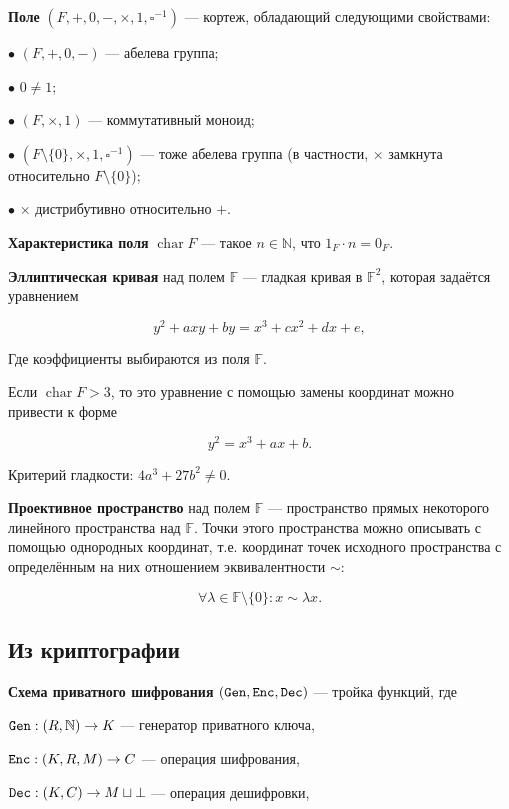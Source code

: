 \documentclass[a4paper,14pt]{extarticle}
\DeclareMathOperator{\chr}{char}
\newcommand{\deff}{\vspace{0.2cm} \noindent}
\begin{document}
\deff \textbf{Поле} $(F, +, 0, -, \times, 1, \square^{-1})$ --- кортеж,
обладающий следующими свойствами:

$\bullet$ $(F, +, 0, -)$ --- абелева группа;

$\bullet$ $0 \ne 1$;

$\bullet$ $(F, \times, 1)$ --- коммутативный моноид;

$\bullet$ $(F \setminus \{0\}, \times, 1, \square^{-1})$ --- тоже абелева группа
(в частности, $\times$ замкнута относительно $F \setminus \{0\}$);

$\bullet$ $\times$ дистрибутивно относительно $+$.

\deff \textbf{Характеристика поля} $\chr F$ --- такое $n \in \mathbb{N}$, что
$1_F \cdot n = 0_F$.

\deff \textbf{Эллиптическая кривая} над полем $\mathbb{F}$ --- гладкая кривая в
$\mathbb{F}^2$, которая задаётся уравнением

\[
    y^2 + a x y + b y = x^3 + c x^2 + d x + e,
\]

Где коэффициенты выбираются из поля $\mathbb{F}$.

Если $\chr F > 3$, то это уравнение с помощью замены координат можно привести к
форме

\[
    y^2 = x^3 + a x + b.
\]

Критерий гладкости: $4 a^3 + 27 b^2 \ne 0$.

\deff \textbf{Проективное пространство} над полем $\mathbb{F}$ ---
пространство прямых некоторого линейного пространства над $\mathbb{F}$. Точки
этого пространства можно описывать с помощью однородных координат, т.е.
координат точек исходного пространства с определённым на них отношением
эквивалентности $\sim$:

\[
    \forall \lambda \in \mathbb{F} \setminus \{0\}: x \sim \lambda x.
\]

\newpage

\subsection{Из криптографии}

\noindent \textbf{Схема приватного шифрования}
$(\verb|Gen|, \verb|Enc|, \verb|Dec|)$ --- тройка функций, где

$\verb|Gen|: (R, \mathbb{N}) \to K$ --- генератор приватного ключа,

$\verb|Enc|: (K, R, M) \to C$ --- операция шифрования,

$\verb|Dec|: (K, C) \to M \sqcup \bot$ --- операция дешифровки,
\end{document}
